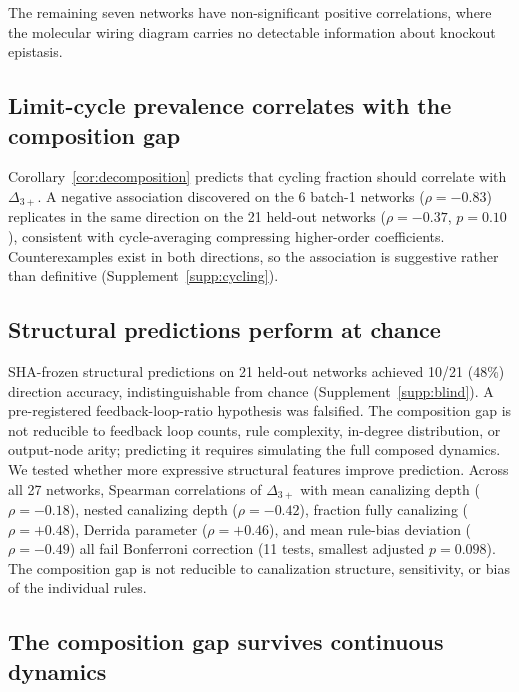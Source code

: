 \documentclass[10pt]{article}
\begin{document}
The remaining seven networks have non-significant positive
correlations, where the molecular wiring diagram carries no detectable
information about knockout epistasis.


\subsection{Limit-cycle prevalence correlates with the composition gap}
\label{sec:cycling}

Corollary~\ref{cor:decomposition} predicts that cycling fraction
should correlate with $\Delta_{3+}$. A negative association
discovered on the 6 batch-1 networks ($\rho = -0.83$) replicates in
the same direction on the 21 held-out networks ($\rho = -0.37$,
$p = 0.10$), consistent with cycle-averaging compressing
higher-order coefficients. Counterexamples exist in both directions,
so the association is suggestive rather than definitive
(Supplement~\ref{supp:cycling}).


\subsection{Structural predictions perform at chance}
\label{sec:blind-results}

SHA-frozen structural predictions on 21 held-out networks achieved
10/21 (48\%) direction accuracy, indistinguishable from chance
(Supplement~\ref{supp:blind}). A pre-registered feedback-loop-ratio
hypothesis was falsified. The composition gap is not reducible to
feedback loop counts, rule complexity, in-degree distribution, or
output-node arity; predicting it requires simulating the full
composed dynamics. We tested whether more expressive structural
features improve prediction. Across all 27 networks, Spearman
correlations of $\Delta_{3+}$ with mean canalizing depth
($\rho = -0.18$), nested canalizing depth ($\rho = -0.42$),
fraction fully canalizing ($\rho = +0.48$), Derrida parameter
($\rho = +0.46$), and mean rule-bias deviation ($\rho = -0.49$)
all fail Bonferroni correction (11 tests, smallest adjusted
$p = 0.098$). The composition gap is not reducible to canalization
structure, sensitivity, or bias of the individual rules.


\subsection{The composition gap survives continuous dynamics}
\label{sec:ode-results}
\end{document}
